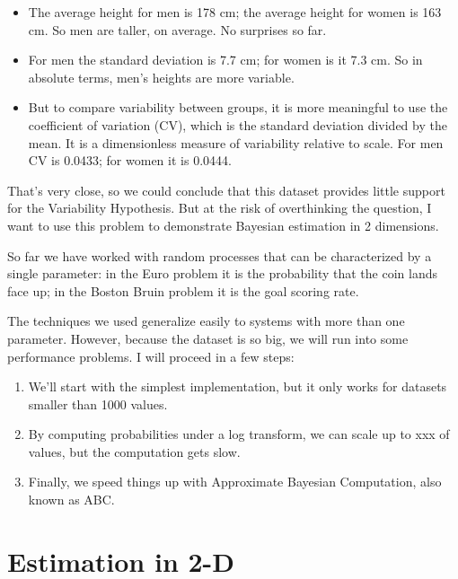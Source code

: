 \documentclass[12pt]{book}
\begin{document}
\begin{itemize}

\item The average height for men is 178 cm; the average height for
  women is 163 cm.  So men are taller, on average.  No surprises so
  far.

\item For men the standard deviation is 7.7 cm; for women is it 7.3
  cm.  So in absolute terms, men's heights are more variable.

\item But to compare
variability between groups, it is more meaningful to use the
coefficient of variation (CV), which is the standard deviation divided
by the mean.  It is a dimensionless measure of variability relative to
scale.  For men CV is 0.0433; for women it is 0.0444.

\end{itemize}

That's very close, so we could conclude that this dataset provides little
support for the Variability Hypothesis.  But at the risk of overthinking
the question, I want to use this problem to demonstrate Bayesian
estimation in 2 dimensions.

So far we have worked with random processes that can be characterized
by a single parameter: in the Euro problem it is the probability
that the coin lands face up; in the Boston Bruin problem it is the
goal scoring rate.

The techniques we used generalize easily to systems with more than one
parameter.  However, because the dataset is so big, we will run into
some performance problems.  I will proceed in a few steps:

\begin{enumerate}

\item We'll start with the simplest implementation, but it only
works for datasets smaller than 1000 values.

\item By computing probabilities under a log transform, we can
scale up to xxx of values, but the computation gets slow.

\item Finally, we speed things up with Approximate Bayesian Computation,
also known as ABC.

\end{enumerate}


\section{Estimation in 2-D}
\end{document}
